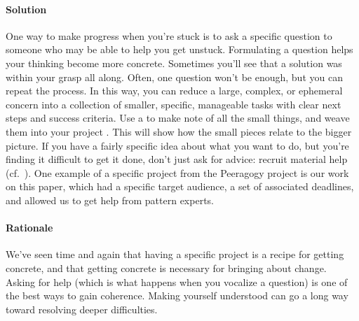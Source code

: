 \begin{refsection}
\paragraph{Solution} 
One way to make progress when you're stuck is to ask a specific question to someone who may be able to help you get unstuck. Formulating a question helps your thinking become more concrete. Sometimes you'll see that a solution was within your grasp all along.  Often, one question won't be enough, but you can repeat the process. In this way, you can reduce a large, complex, or ephemeral concern into a collection of smaller, specific, manageable tasks with clear next steps and success criteria. Use a  to make note of all the small things, and weave them into your project . This will show how the small pieces relate to the bigger picture. If you have a fairly specific idea about what you want to do, but you're finding it difficult to get it done, don't just ask for advice: recruit material help (cf.~). One example of a specific project from the Peeragogy project is our work on this paper, which had a specific target audience, a set of associated deadlines, and allowed us to get help from pattern experts. 

\paragraph{Rationale} 
We've seen time and again that having a specific project is a recipe for getting concrete, and that getting concrete is necessary for bringing about change. Asking for help (which is what happens when you vocalize a question) is one of the best ways to gain coherence. Making yourself understood can go a long way toward resolving deeper difficulties.


\end{refsection}
